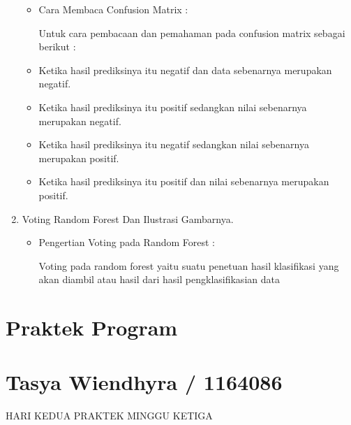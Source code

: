 \begin{enumerate}
\begin{itemize}
\item Cara Membaca Confusion Matrix :
\par Untuk cara pembacaan dan pemahaman pada confusion matrix sebagai berikut :
\item Ketika hasil prediksinya itu negatif dan data sebenarnya merupakan negatif.
\item Ketika hasil prediksinya itu positif sedangkan nilai sebenarnya merupakan negatif.
\item Ketika hasil prediksinya itu negatif sedangkan nilai sebenarnya merupakan positif.
\item Ketika hasil prediksinya itu positif dan nilai sebenarnya merupakan positif.
\end{itemize}
\par

\par
\par
\item Voting Random Forest Dan Ilustrasi Gambarnya.
\par
\begin{itemize}
\item Pengertian Voting pada Random Forest :
\par Voting pada random forest yaitu suatu penetuan hasil klasifikasi yang akan diambil atau hasil dari hasil pengklasifikasian data
\par 
\end{itemize}
\end{enumerate}

\section{Praktek Program}
\section{Tasya Wiendhyra / 1164086}
HARI KEDUA PRAKTEK MINGGU KETIGA
